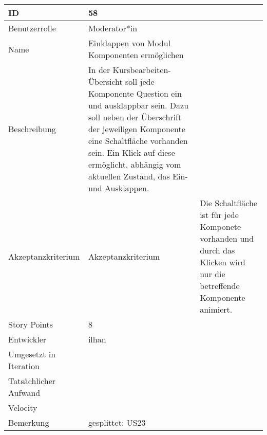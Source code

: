 \begin{tabularx}{\textwidth}{|p{}|X|}
	\hline
	ID & 58\\
	\hline
	Benutzerrolle & Moderator*in\\
	\hline
	Name & Einklappen von Modul Komponenten ermöglichen\\
	\hline
	Beschreibung & In der Kursbearbeiten-Übersicht soll jede Komponente Question ein und ausklappbar sein.
		Dazu soll neben der Überschrift der jeweiligen Komponente eine Schaltfläche vorhanden sein.
		Ein Klick auf diese ermöglicht, abhängig vom aktuellen Zustand, das Ein- und Ausklappen.\\
	\hline
	Akzeptanzkriterium & Akzeptanzkriterium & Die Schaltfläche ist für jede Komponete vorhanden und durch das Klicken wird nur die betreffende Komponente animiert.\\
	\hline
	Story Points & 8\\
	\hline
	Entwickler & ilhan\\
	\hline
	Umgesetzt in Iteration & \\ 
	\hline
	Tatsächlicher Aufwand & \\
	\hline
	Velocity & \\
	\hline
	Bemerkung & gesplittet: US23\\
	\hline
\end{tabularx}
\vspace{20pt}
